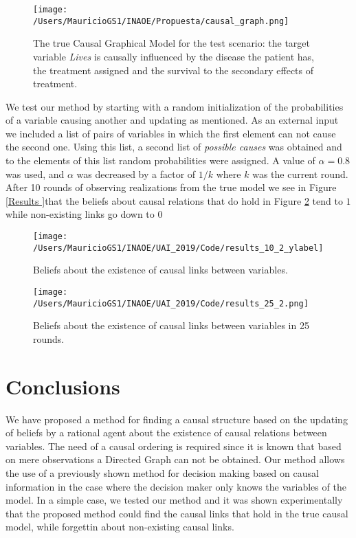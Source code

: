 \documentclass[letterpaper]{article}
\begin{document}
\begin{figure}[ht]
\vskip 0.2in
\begin{center}
\centerline{\texttt{[image: /Users/MauricioGS1/INAOE/Propuesta/causal\_graph.png]}}
\caption{The true Causal Graphical Model for the test scenario: the target variable \textit{Lives} is causally influenced by the disease the patient has, the treatment assigned and the survival to the secondary effects of treatment.}
\label{causal_model}
\end{center}
\vskip -0.2in
\end{figure}

We test our method by starting with a random initialization of the probabilities of a variable causing another and updating as mentioned. As an external input we included a list of pairs of variables in which the first element can not cause the second one. Using this list, a second list of \textit{possible causes} was obtained and to the elements of this list random probabilities were assigned. A value of $\alpha=0.8$ was used, and $\alpha$ was decreased by a factor of $1/k$ where $k$ was the current round. After 10 rounds of observing realizations from the true model we see in Figure \ref{Results }that the beliefs about causal relations that do hold in Figure \ref{10_rounds} tend to $1$ while non-existing links go down to $0$ 

\begin{figure}[ht]
\vskip 0.2in
\begin{center}
\centerline{\texttt{[image: /Users/MauricioGS1/INAOE/UAI\_2019/Code/results\_10\_2\_ylabel]}}
\caption{Beliefs about the existence of causal links between variables.}
\label{10_rounds}
\end{center}
\vskip -0.2in
\end{figure}

\begin{figure}[ht]
\vskip 0.2in
\begin{center}
\centerline{\texttt{[image: /Users/MauricioGS1/INAOE/UAI\_2019/Code/results\_25\_2.png]}}
\caption{Beliefs about the existence of causal links between variables in 25 rounds.}
\label{25_rounds}
\end{center}
\vskip -0.2in
\end{figure}

\section{Conclusions}
We have proposed a method for finding a causal structure based on the updating of beliefs by a rational agent about the existence of causal relations between variables. The need of a causal ordering is required since it is known that based on mere observations a Directed Graph can not be obtained. Our method allows the use of a previously shown method for decision making based on causal information in the case where the decision maker only knows the variables of the model. In a simple case, we tested our method and it was shown experimentally that the proposed method could find the causal links that hold in the true causal model, while forgettin about non-existing causal links.
\end{document}
